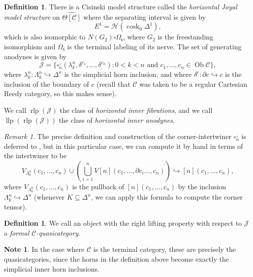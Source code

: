 \documentclass[a4paper]{article}
\numberwithin{equation}{subsection}
\theoremstyle{plain}   %
\theoremstyle{definition}
\newtheorem{defn}[equation]{Definition}
\newtheorem{note}[equation]{Note}
\theoremstyle{remark}
\newtheorem{rem}[equation]{Remark}
\theoremstyle{plain}
\DeclareMathOperator{\Ob}{Ob}
\providecommand{\C}{}
\renewcommand{\C}{\ensuremath{\mathcal{C}}}
\newcommand{\cellset}{\ensuremath{\widehat{\Theta[\mathcal{C}]}}}
\begin{document}
\begin{defn}\label{modelstrucdefn}
	There is a Cisinski model structure called the \emph{horizontal Joyal model structure} on \(\cellset\) where the separating interval is given by 
	\[E^1=\mathscr{H}(\operatorname{cosk}_0 \Delta^1),\]
	which is also isomorphic to \(N(G_2)\square \Omega_{\mathfrak{t}}\), where \(G_2\) is the freestanding isomorphism and \(\Omega_{\mathfrak{t}}\) is the terminal labeling of its nerve. 
	The set of generating anodynes is given by
	\[
		\mathscr{J}=\{\square_n^\lrcorner(\lambda^n_k,\delta^{c_1},\dots,\delta^{c_n}) : 0<k<n \text{ and } c_1,\dots,c_n \in \Ob \C\},
	\]
	where \(\lambda^n_k:\Lambda^n_k\hookrightarrow \Delta^n\) is the simplicial horn inclusion, and where \(\delta^c:\partial c \hookrightarrow c\) is the inclusion of the boundary of \(c\) (recall that \(\C\) was taken to be a regular Cartesian Reedy category, so this makes sense).

	We call \(\operatorname{rlp}(\mathscr{J})\) the class of \emph{horizontal inner fibrations}, and we call \(\operatorname{llp}(\operatorname{rlp}(\mathscr{J}))\) the class of \emph{horizontal inner anodynes}.
\end{defn}

\begin{rem}
	The precise definition and construction of the corner-intertwiner \(\square^\lrcorner_n\) is deferred to , but in this particular case, we can compute it by hand in terms of the intertwiner to be \[V_{\Lambda^n_k}(c_1,\dots,c_n) \cup \left(\bigcup_{i=1}^n V[n](c_1,\dots,\partial c_i \dots, c_n) \right) \hookrightarrow [n](c_1,\dots,c_n),\] where \(V_{\Lambda^n_k}(c_1,\dots,c_n)\) is the pullback of \([n](c_1,\dots,c_n)\) by the inclusion \(\Lambda^n_k\hookrightarrow \Delta^n\) (whenever \(K\subseteq \Delta^n\), we can apply this formula to compute the corner tensor).
\end{rem}

\begin{defn}
	We call an object with the right lifting property with respect to \(\mathscr{J}\) a \emph{formal \(\C\)-quasicategory}.
\end{defn}

\begin{note} 
	In the case where \(\C\) is the terminal category, these are precisely the quasicategories, since the horns in the definition above become exactly the simplicial inner horn inclusions.
\end{note}
\end{document}

